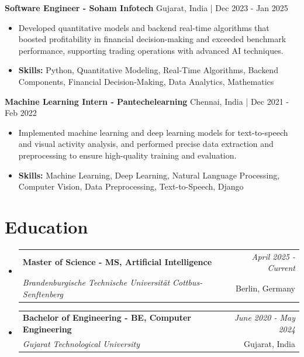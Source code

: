 \documentclass[a4paper,11pt]{article}
\makeatletter
\newcommand{\resumeSubheading}[4]{
\vspace{0.5mm}\item
    \begin{tabular*}{0.98\textwidth}[t]{l@{\extracolsep{\fill}}r}
        \textbf{#1} & \textit{\footnotesize{#4}} \\
        \textit{\footnotesize{#3}} &  \footnotesize{#2}\\
    \end{tabular*}
    \vspace{-2.4mm}
}
\makeatother
\begin{document}
\vspace{1mm}
  \textbf{Software Engineer - Soham Infotech} \hfill Gujarat, India | Dec 2023 - Jan 2025
\vspace{-1.5mm} %
\begin{itemize}
  \item Developed quantitative models and backend real-time algorithms that boosted profitability in financial decision-making and exceeded benchmark performance, supporting trading operations with advanced AI techniques.

\vspace{-2mm}
  \item \textbf{Skills:} Python, Quantitative Modeling, Real-Time Algorithms, Backend Components, Financial Decision-Making, Data Analytics, Mathematics
\end{itemize}

\vspace{1mm}
  \textbf{Machine Learning Intern - Pantechelearning} \hfill Chennai, India | Dec 2021 - Feb 2022
\vspace{-1.5mm} %
\begin{itemize}
  \item Implemented machine learning and deep learning models for text-to-speech and visual activity analysis, and performed precise data extraction and preprocessing to ensure high-quality training and evaluation.
\vspace{-2mm}
  \item \textbf{Skills:} Machine Learning, Deep Learning, Natural Language Processing, Computer Vision, Data Preprocessing, Text-to-Speech, Django
\end{itemize}\section{\textbf{Education}}
\vspace{-0.4mm}

\begin{itemize}
\resumeSubheading
{Master of Science - MS, Artificial Intelligence }{Berlin, Germany}
{Brandenburgische Technische Universität Cottbus-Senftenberg  }{April 2025 - Current}

\vspace{1.0mm} %
\resumeSubheading
{Bachelor of Engineering - BE, Computer Engineering  }{Gujarat, India}
{Gujarat Technological University }{June 2020 - May 2024}

\end{itemize}
\end{document}
